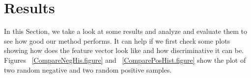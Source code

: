 \section{Results}
\label{Results.sec}
In this Section, we take a look at some results and analyze and evaluate them to see how good our method performs.
It can help if we first check some plots showing how does the feature vector look like and how discriminative it can be.
Figures ~\ref{CompareNegHis.figure} and ~\ref{ComparePosHist.figure} show the plot of two random negative and two random 
positive samples.   
\begin{figure}[htp]
  \begin{center}

\end{center}
\end{figure}
